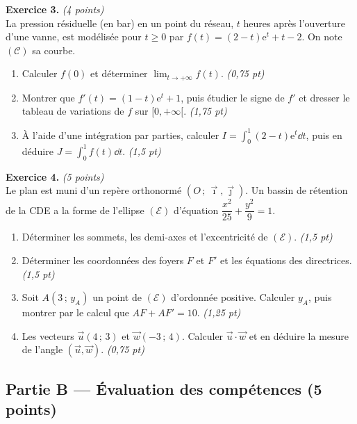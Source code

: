 \smallskip
\noindent\textbf{Exercice 3.} \hfill\textit{(4 points)}\\
La pression résiduelle (en bar) en un point du réseau, $t$ heures après l'ouverture d'une
vanne, est modélisée pour $t\ge0$ par $f(t)=(2-t)\mathrm{e}^{t}+t-2$. On note $(\mathcal{C})$ sa courbe.
\begin{enumerate}[label=\arabic*)]
\item Calculer $f(0)$ et déterminer $\displaystyle\lim_{t\to+\infty}f(t)$. \hfill\textit{(0,75 pt)}
\item Montrer que $f'(t)=(1-t)\mathrm{e}^{t}+1$, puis étudier le signe de $f'$ et dresser le
tableau de variations de $f$ sur $[0,+\infty[$. \hfill\textit{(1,75 pt)}
\item À l'aide d'une intégration par parties, calculer $\displaystyle I=\int_0^{1}(2-t)\mathrm{e}^{t}\dd t$,
puis en déduire $\displaystyle J=\int_0^{1}f(t)\dd t$. \hfill\textit{(1,5 pt)}
\end{enumerate}

\smallskip
\noindent\textbf{Exercice 4.} \hfill\textit{(5 points)}\\
Le plan est muni d'un repère orthonormé $(O\,;\,\vec\imath,\vec\jmath)$. Un bassin de rétention de
la CDE a la forme de l'ellipse $(\mathcal{E})$ d'équation $\dfrac{x^2}{25}+\dfrac{y^2}{9}=1$.
\begin{enumerate}[label=\arabic*)]
\item Déterminer les sommets, les demi-axes et l'excentricité de $(\mathcal{E})$. \hfill\textit{(1,5 pt)}
\item Déterminer les coordonnées des foyers $F$ et $F'$ et les équations des directrices. \hfill\textit{(1,5 pt)}
\item Soit $A(3\,;\,y_A)$ un point de $(\mathcal{E})$ d'ordonnée positive. Calculer $y_A$, puis
montrer par le calcul que $AF+AF'=10$. \hfill\textit{(1,25 pt)}
\item Les vecteurs $\vec u(4\,;\,3)$ et $\vec w(-3\,;\,4)$. Calculer $\vec u\cdot\vec w$ et en
déduire la mesure de l'angle $(\vec u,\vec w)$. \hfill\textit{(0,75 pt)}
\end{enumerate}

\subsection*{Partie B — Évaluation des compétences \hfill (5 points)}

